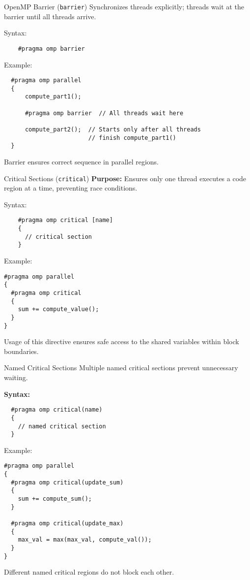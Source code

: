 \documentclass{beamer}
\begin{document}
\begin{frame}[fragile]{OpenMP Barrier (\texttt{barrier})}
  Synchronizes threads explicitly; threads wait at the barrier until all threads arrive.

  Syntax:
  \begin{verbatim}
    #pragma omp barrier
  \end{verbatim}

  Example:
  \lstset{style=CStyle}
  \begin{lstlisting}
  #pragma omp parallel
  {
      compute_part1();

      #pragma omp barrier  // All threads wait here

      compute_part2();  // Starts only after all threads
                        // finish compute_part1()
  }
  \end{lstlisting}

  Barrier ensures correct sequence in parallel regions.
\end{frame}

\begin{frame}[fragile]{Critical Sections (\texttt{critical})}
  \textbf{Purpose:}
  Ensures only one thread executes a code region at a time, preventing race conditions.

  Syntax:
  \begin{verbatim}
    #pragma omp critical [name]
    {
      // critical section
    }
  \end{verbatim}

  Example:
  \lstset{style=CStyle}
  \begin{lstlisting}
#pragma omp parallel
{
  #pragma omp critical
  {
    sum += compute_value();
  }
}
  \end{lstlisting}

  Usage of this directive ensures safe access to the shared variables within block boundaries.
\end{frame}

\begin{frame}[fragile]{Named Critical Sections}
  Multiple named critical sections prevent unnecessary waiting.

  \textbf{Syntax:}
  \begin{verbatim}
  #pragma omp critical(name)
  {
    // named critical section
  }
  \end{verbatim}

  Example:
  \lstset{style=CStyle}
  \begin{lstlisting}
#pragma omp parallel
{
  #pragma omp critical(update_sum)
  {
    sum += compute_sum();
  }

  #pragma omp critical(update_max)
  {
    max_val = max(max_val, compute_val());
  }
}
  \end{lstlisting}

  Different named critical regions do not block each other.
\end{frame}
\end{document}
